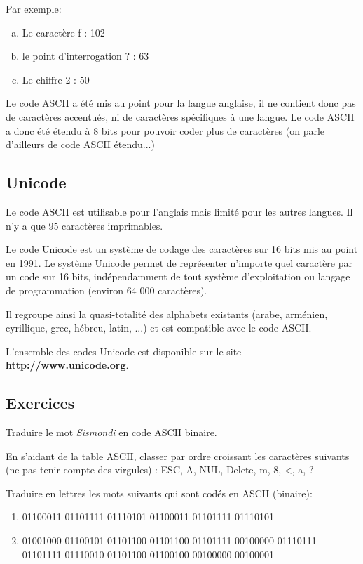 \documentclass[11pt, a4paper]{book}
\begin{document}
Par exemple: 
\begin{enumerate}[a)]
\item Le caractère f : 102 
\item le point d'interrogation ? : 63 
\item Le chiffre 2 : 50
\end{enumerate}

Le code ASCII a été mis au point pour la langue anglaise, il ne contient donc pas de caractères accentués, ni de caractères spécifiques à une langue. Le code ASCII a donc été étendu à 8 bits pour pouvoir coder plus de caractères (on parle d'ailleurs de code ASCII étendu...)

\subsection{Unicode}

Le code ASCII est utilisable pour l'anglais mais limité pour les autres langues. Il n'y a que 95 caractères imprimables.

Le code Unicode est un système de codage des caractères sur 16 bits mis au point en 1991. Le système Unicode permet de représenter n'importe quel caractère par un code sur 16 bits, indépendamment de tout système d'exploitation ou langage de programmation (environ 64 000 caractères).

Il regroupe ainsi la quasi-totalité des alphabets existants (arabe, arménien, cyrillique, grec, hébreu, latin, ...) et est compatible avec le code ASCII.

L'ensemble des codes Unicode est disponible sur le site {\bf http://www.unicode.org}.


\subsection{Exercices}
\begin{exercice}
Traduire le mot {\it Sismondi} en code ASCII binaire.
\end{exercice}

\begin{exercice}
En s’aidant de la table ASCII, classer par ordre croissant les caractères suivants (ne pas tenir compte des virgules) : ESC, A, NUL, Delete, m, 8, <, a, ?
\end{exercice}

\begin{exercice}
Traduire en lettres les mots suivants qui sont codés en ASCII (binaire):
\begin{enumerate}
\item 01100011 01101111 01110101 01100011 01101111 01110101
\item 01001000 01100101 01101100 01101100 01101111 00100000 01110111 01101111 01110010 01101100 01100100 00100000 00100001
\end{enumerate}
\end{exercice}
\end{document}

